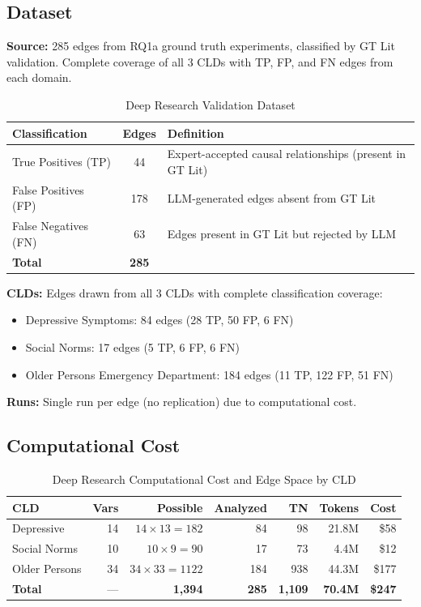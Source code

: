 \subsection{Dataset}

\textbf{Source:} 285 edges from RQ1a ground truth experiments, classified by GT Lit validation. Complete coverage of all 3 CLDs with TP, FP, and FN edges from each domain.

\begin{table}[H]
\centering
\caption{Deep Research Validation Dataset}
\label{tab:dr_dataset}
\footnotesize
\begin{tabular}{@{}l c l@{}}
\toprule
\textbf{Classification} & \textbf{Edges} & \textbf{Definition} \\
\midrule
True Positives (TP) & 44 & Expert-accepted causal relationships (present in GT Lit) \\
False Positives (FP) & 178 & LLM-generated edges absent from GT Lit \\
False Negatives (FN) & 63 & Edges present in GT Lit but rejected by LLM \\
\midrule
\textbf{Total} & \textbf{285} & \\
\bottomrule
\end{tabular}
\end{table}

\textbf{CLDs:} Edges drawn from all 3 CLDs with complete classification coverage:
\begin{itemize}[noitemsep]
    \item Depressive Symptoms: 84 edges (28 TP, 50 FP, 6 FN)
    \item Social Norms: 17 edges (5 TP, 6 FP, 6 FN)
    \item Older Persons Emergency Department: 184 edges (11 TP, 122 FP, 51 FN)
\end{itemize}

\textbf{Runs:} Single run per edge (no replication) due to computational cost.

\subsection{Computational Cost}

\begin{table}[H]
\centering
\caption{Deep Research Computational Cost and Edge Space by CLD}
\label{tab:dr_cost}
\footnotesize
\begin{tabular}{@{}l r r r r r r@{}}
\toprule
\textbf{CLD} & \textbf{Vars} & \textbf{Possible} & \textbf{Analyzed} & \textbf{TN} & \textbf{Tokens} & \textbf{Cost} \\
\midrule
Depressive & 14 & $14 \times 13 = 182$ & 84 & 98 & 21.8M & \$58 \\
Social Norms & 10 & $10 \times 9 = 90$ & 17 & 73 & 4.4M & \$12 \\
Older Persons & 34 & $34 \times 33 = 1122$ & 184 & 938 & 44.3M & \$177 \\
\midrule
\textbf{Total} & --- & \textbf{1,394} & \textbf{285} & \textbf{1,109} & \textbf{70.4M} & \textbf{\$247} \\
\bottomrule
\end{tabular}
\end{table}


